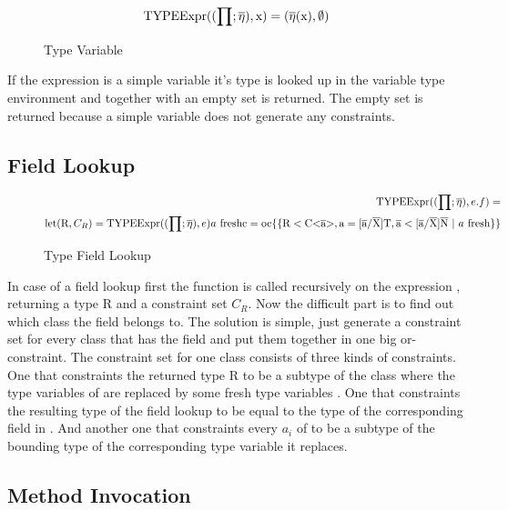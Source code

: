 \begin{figure}[H]
    \begin{align*}
        \text{TYPEExpr}((\prod; \overline{\eta}), \text{x}) = (\overline{\eta} (\text{x}), \emptyset)
    \end{align*}
    \caption{Type Variable}
    \label{type_variable}
\end{figure}

If the expression is a simple variable it's type is looked up in the variable type environment and together with an empty set is returned. The empty set is returned because a simple variable does not generate any constraints.

\subsection{Field Lookup}

\begin{figure}[H]
    \begin{align*}
        \texpr{e.f} = \\
        \text{let} ( \text{R}, C_R ) = \texpr{e}
        \fresh{a}
        \text{c} = \text{oc} \{ \{ \text{R} < \text{C<} \ot{a} \text{>}, \text{a} = \tsxsn{a}{X}{T}, \ot{a} < \tsxsns{a}{X}{N} \ | \ \fresh{a} \} \}
    \end{align*}
    \caption{Type Field Lookup}
    \label{type_field_lookup}
\end{figure}

In case of a field lookup  first the  function is called recursively on the expression , returning a
type R and a constraint set $C_R$. Now the difficult part is to find out which class the field  belongs to. The solution is simple,
just generate a constraint set for every class  that has the field  and put them together in one big or-constraint.
The constraint set for one class consists of three kinds of constraints. One that constraints the returned type R to be a subtype
of the class  where the type variables of  are replaced by some fresh type variables . One that constraints the resulting type of the field lookup
to be equal to the type of the corresponding field in . And another one that constraints every $a_i$ of  to be a subtype of the bounding type of the corresponding type variable it replaces.

\subsection{Method Invocation}

